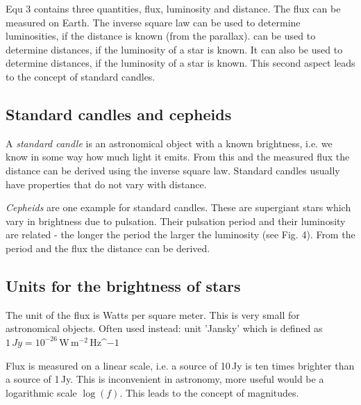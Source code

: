 Equ 3 contains three quantities, flux, luminosity and distance. The flux can be measured on Earth. The inverse square law can be used to determine luminosities, if the distance is known (from the parallax). can be used to determine distances, if the luminosity of a star is known. It can also be used to determine distances, if the luminosity of a star is known. This second aspect leads to the concept of standard candles.

\subsection{Standard candles and cepheids}

A \textit{standard candle} is an astronomical object with a known brightness, i.e. we know in some way how much light it emits. From this and the measured flux the distance can be derived using the inverse square law. Standard candles usually have properties that do not vary with distance.

\textit{Cepheids} are one example for standard candles. These are supergiant stars which vary in brightness due to pulsation. Their pulsation period and their luminosity are related - the longer the period the larger the luminosity (see Fig. 4). From the period and the flux the distance can be derived.

\subsection{Units for the brightness of stars}

The unit of the flux is Watts per square meter. This is very small for astronomical objects. Often used instead: unit 'Jansky' which is defined as $1\,Jy = 10^{-26}$\,W\,m$^{-2}$\,Hz^${-1}$

Flux is measured on a linear scale, i.e. a source of 10\,Jy is ten times brighter than a source of 1\,Jy. This is inconvenient in astronomy, more useful would be a logarithmic scale $\log{(f)}$. This leads to the concept of magnitudes.



